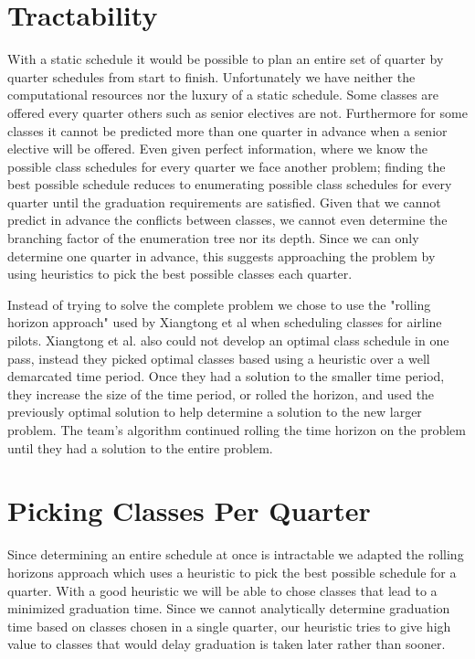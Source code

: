 \documentclass[11pt]{article} %
\begin{document}
\section{Tractability} With a static schedule it would be
possible to plan an entire set of quarter by quarter schedules from start to
finish. Unfortunately we have neither the computational resources nor the luxury
of a static schedule. Some classes are offered every quarter others such as
senior electives are not. Furthermore for some classes it cannot be predicted
more than one quarter in advance when a senior elective will be offered. Even
given perfect information, where we know the possible class schedules for every
quarter we face another problem; finding the best possible schedule reduces to
enumerating possible class schedules for every quarter until the graduation
requirements are satisfied.  Given that we cannot predict in advance the
conflicts between classes, we cannot even determine the branching factor of the
enumeration tree nor its depth. Since we can only determine one quarter in
advance, this suggests approaching the problem by using heuristics to pick the
best possible classes each quarter.

Instead of trying to solve the complete problem we chose to use the "rolling
horizon approach" used by Xiangtong et al \cite{xiangton:informs} when
scheduling classes for airline pilots. Xiangtong et al. also could not develop
an optimal class schedule in one pass, instead they picked optimal classes based
using a heuristic over a well demarcated time period. Once they had a solution
to the smaller time period, they increase the size of the time period, or rolled
the horizon, and used the previously optimal solution to help determine
a solution to the new larger problem. The team's algorithm continued rolling the
time horizon on the problem until they had a solution to the entire problem.

\section{Picking Classes Per Quarter} Since determining an entire schedule at
once is intractable we adapted the rolling horizons approach which uses
a heuristic to pick the best possible schedule for a quarter. With a good
heuristic we will be able to chose classes that lead to a minimized graduation
time. Since we cannot analytically determine graduation time based on classes
chosen in a single quarter, our heuristic tries to give high value to classes
that would delay graduation is taken later rather than sooner. 
\end{document}
